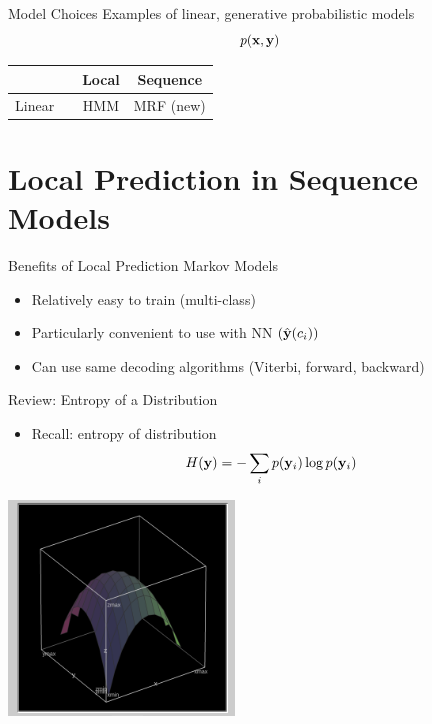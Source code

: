 \documentclass{beamer}
\begin{document}
\begin{frame}{Model Choices}
  Examples of linear, generative probabilistic models
  \air 
  \[p(\mathbf{x}, \mathbf{y})\] 

  \begin{center}
    \begin{tabular}{llcc}
      \toprule
       && Local & Sequence \\ 
      \midrule
      Linear &&  HMM &  MRF (new)  \\ 
      \bottomrule
    \end{tabular}
  \end{center}
\end{frame}

\section{Local Prediction in Sequence Models }

\begin{frame}{Benefits of Local Prediction Markov Models}
  \begin{itemize}
  \item Relatively easy to train (multi-class)
    \air 

    
  \item Particularly convenient to use with NN $(\hat{\mathbf{y}}(c_i))$
    \air 

  \item Can use same decoding algorithms (Viterbi, forward, backward)
  \end{itemize}
\end{frame}

\begin{frame}{Review: Entropy of a Distribution}
  \begin{itemize}

    \air 
  \item Recall: entropy of distribution
    \[H(\mathbf{y}) = - \sum_{i} p(\mathbf{y}_i) \log p(\mathbf{y}_i) \]
    
  \end{itemize}
  \begin{center}
    \includegraphics[width=6cm]{entropy}
  \end{center}
\end{frame}
\end{document}
